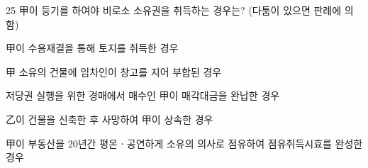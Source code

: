 \begin{question}{25}
甲이 등기를 하여야 비로소 소유권을 취득하는 경우는? (다툼이 있으면 판례에 의함)
\begin{choices}
  \item 甲이 수용재결을 통해 토지를 취득한 경우
  \item 甲 소유의 건물에 임차인이 창고를 지어 부합된 경우
  \item 저당권 실행을 위한 경매에서 매수인 甲이 매각대금을 완납한 경우
  \item 乙이 건물을 신축한 후 사망하여 甲이 상속한 경우
  \item 甲이 부동산을 20년간 평온ㆍ공연하게 소유의 의사로 점유하여 점유취득시효를 완성한 경우
\end{choices}
\end{question}

